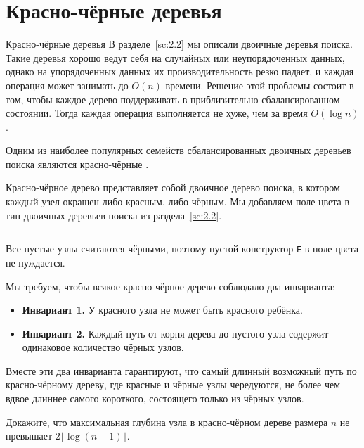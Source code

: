 
\fi

\section{Красно-чёрные деревья}
\label{sc:3.3}

\begin{frame}[fragile]{Красно-чёрные деревья}
В разделе~\ref{sc:2.2} мы описали двоичные деревья поиска. Такие
деревья хорошо ведут себя на случайных или неупорядоченных данных,
однако на упорядоченных данных их производительность резко падает, и
каждая операция может занимать до $O(n)$  времени.  Решение этой
проблемы состоит в том, чтобы каждое дерево поддерживать в
приблизительно сбалансированном состоянии. Тогда каждая операция
выполняется не хуже, чем за время $O(\log n)$. 

 Одним из наиболее
популярных семейств сбалансированных двоичных деревьев поиска являются
красно-чёрные \cite{GuibasSedgewick1978}.
\end{frame}

\begin{frame}[fragile]{}
Красно-чёрное дерево представляет собой двоичное дерево поиска, в
котором каждый узел окрашен либо красным, либо чёрным. Мы добавляем
поле цвета в тип двоичных деревьев поиска из раздела~\ref{sc:2.2}.

\inputminted[firstline=6,lastline=7] {haskell}{code/RedBlackSet.lhs}
Все пустые узлы считаются чёрными, поэтому пустой конструктор
\lstinline!E! в поле цвета не нуждается.

\end{frame}

\begin{frame}[fragile]{}
Мы требуем, чтобы всякое красно-чёрное дерево соблюдало два
инварианта:
\begin{itemize}
  \item \textbf{Инвариант 1.} У красного узла не может быть красного ребёнка.
  \item \textbf{Инвариант 2.} Каждый путь от корня дерева до пустого
  узла содержит одинаковое количество чёрных узлов.
\end{itemize}
Вместе эти два инварианта гарантируют, что самый длинный возможный
путь по красно-чёрному дереву, где красные и чёрные узлы чередуются,
не более чем вдвое длиннее самого короткого, состоящего только из
чёрных узлов.

\ifanswers
\begin{exercise}\label{ex:3.8}
  Докажите, что максимальная глубина узла в красно-чёрном дереве
  размера $n$ не превышает $2 \lfloor \log (n+1) \rfloor$.
\end{exercise}
\fi
\end{frame}

